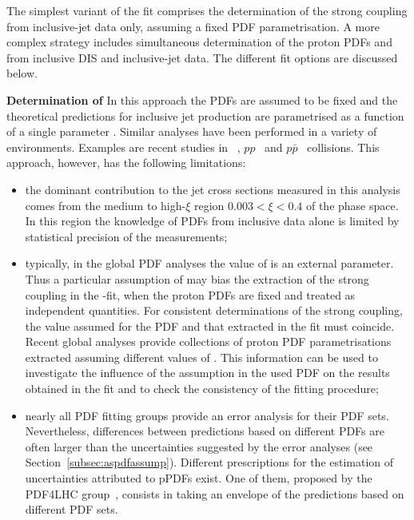 The simplest variant of the fit comprises the determination of the strong coupling \asz from inclusive-jet data only, assuming a fixed PDF parametrisation. A more complex strategy includes simultaneous determination of the proton PDFs and \asz from inclusive DIS and inclusive-jet data. The different fit options are discussed below.
 
{\flushleft \textbf{Determination of \asz}}\newline
In this approach the PDFs are assumed to be fixed and the theoretical predictions for inclusive jet production are parametrised as a function of a single parameter \asz. Similar analyses have been performed in a variety of environments. Examples are recent studies in \ep~\cite{np:b864:1,epj:c75:65}, $pp$~\cite{CMS:2014mna,Chatrchyan:2013txa} and $p\bar{p}$~\cite{Affolder:2001hn,Abazov:2012lua,Abazov:2009nc} collisions. This approach, however, has the following limitations:
\begin{itemize}
 \item the dominant contribution to the jet cross sections measured in this analysis comes from the medium to high-$\xi$ region $0.003<\xi<0.4$ of the phase space. In this region the knowledge of PDFs from \hera inclusive data alone is limited by statistical precision of the measurements;
 \item typically, in the global PDF analyses the value of \asz is an external parameter. Thus a particular assumption of \asz may bias the extraction of the strong coupling in the \as-fit, when the proton PDFs are fixed and treated as independent quantities. For consistent determinations of the strong coupling, the value assumed for the PDF and that extracted in the fit must coincide. Recent global analyses provide collections of proton PDF parametrisations extracted assuming different values of \asz. This information can be used to investigate the influence of the \asz assumption in the used PDF on the \as results obtained in the fit and to check the consistency of the fitting procedure;
 \item nearly all PDF fitting groups provide an error analysis for their PDF sets. Nevertheless, differences between predictions based on different PDFs are often larger than the uncertainties suggested by the error analyses (see Section~\ref{subsec:aspdfassump}). Different prescriptions for the estimation of uncertainties attributed to pPDFs exist. One of them, proposed by the PDF4LHC group~\cite{pdf4lhc:2011}, consists in taking an envelope of the predictions based on different PDF sets. %
\end{itemize}


